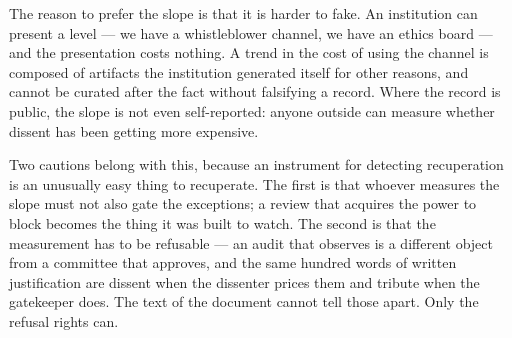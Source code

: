 The reason to prefer the slope is that it is harder to fake. An institution can present a level — we have a whistleblower channel, we have an ethics board — and the presentation costs nothing. A trend in the cost of using the channel is composed of artifacts the institution generated itself for other reasons, and cannot be curated after the fact without falsifying a record. Where the record is public, the slope is not even self-reported: anyone outside can measure whether dissent has been getting more expensive.

Two cautions belong with this, because an instrument for detecting recuperation is an unusually easy thing to recuperate. The first is that whoever measures the slope must not also gate the exceptions; a review that acquires the power to block becomes the thing it was built to watch. The second is that the measurement has to be refusable — an audit that observes is a different object from a committee that approves, and the same hundred words of written justification are dissent when the dissenter prices them and tribute when the gatekeeper does. The text of the document cannot tell those apart. Only the refusal rights can.
